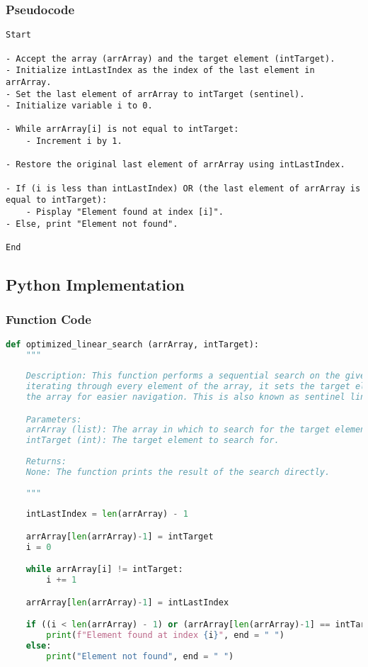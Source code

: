 \documentclass{article}
\begin{document}
\subsubsection*{Pseudocode}
\begin{lstlisting}
Start

- Accept the array (arrArray) and the target element (intTarget).
- Initialize intLastIndex as the index of the last element in arrArray.
- Set the last element of arrArray to intTarget (sentinel).
- Initialize variable i to 0.

- While arrArray[i] is not equal to intTarget:
    - Increment i by 1.

- Restore the original last element of arrArray using intLastIndex.

- If (i is less than intLastIndex) OR (the last element of arrArray is equal to intTarget):
    - Pisplay "Element found at index [i]".
- Else, print "Element not found".

End
\end{lstlisting}

\subsection*{Python Implementation}
\subsubsection*{Function Code}
\begin{lstlisting}[language=Python]
def optimized_linear_search (arrArray, intTarget):
    """
    
    Description: This function performs a sequential search on the given array, but instead of
    iterating through every element of the array, it sets the target element to the last element of
    the array for easier navigation. This is also known as sentinel linear search.

    Parameters:
    arrArray (list): The array in which to search for the target element.
    intTarget (int): The target element to search for.
    
    Returns:
    None: The function prints the result of the search directly.
    
    """
    
    intLastIndex = len(arrArray) - 1

    arrArray[len(arrArray)-1] = intTarget
    i = 0

    while arrArray[i] != intTarget:
        i += 1

    arrArray[len(arrArray)-1] = intLastIndex

    if ((i < len(arrArray) - 1) or (arrArray[len(arrArray)-1] == intTarget)):
        print(f"Element found at index {i}", end = " ")
    else:
        print("Element not found", end = " ")
\end{lstlisting}
\end{document}
